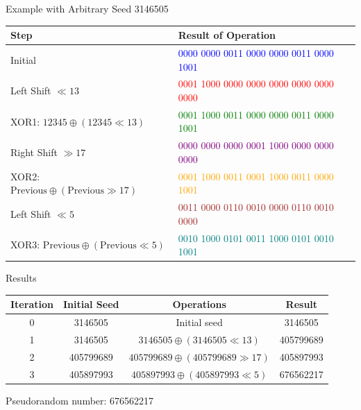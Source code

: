 \documentclass[aspectratio=169]{beamer}
\begin{document}
\begin{frame}{Example with Arbitrary Seed 3146505}
\begin{table}[h]

\begin{tabular}{|l|l|}
\hline
\textbf{Step} & \textbf{Result of Operation} \\
\hline
Initial & 
\textcolor{blue}{0000 0000 0011 0000 0000 0011 0000 1001} \\
\hline
Left Shift $\ll 13$ & 
\textcolor{red}{0001 1000 0000 0000 0000 0000 0000 0000} \\
\hline
XOR1: $12345 \oplus (12345 \ll 13)$ & 
\textcolor{green}{0001 1000 0011 0000 0000 0011 0000 1001} \\
\hline
Right Shift $\gg 17$ & 
\textcolor{purple}{0000 0000 0000 0001 1000 0000 0000 0000} \\
\hline
XOR2: $\text{Previous} \oplus (\text{Previous} \gg 17)$ & 
\textcolor{orange}{0001 1000 0011 0001 1000 0011 0000 1001} \\
\hline
Left Shift $\ll 5$ & 
\textcolor{brown}{0011 0000 0110 0010 0000 0110 0010 0000} \\
\hline
XOR3: $\text{Previous} \oplus (\text{Previous} \ll 5)$ & 
\textcolor{teal}{0010 1000 0101 0011 1000 0101 0010 1001} \\
\hline

\end{tabular}
\end{table}
\end{frame}

\begin{frame}{Results}
  
\begin{table}[h]

\begin{tabular}{|c|c|c|c|}
\hline
Iteration & Initial Seed & Operations & Result \\
\hline
0 & 3146505 & Initial seed & 3146505 \\
1 & 3146505 & $3146505 \oplus (3146505 \ll 13)$ & 405799689 \\
2 & 405799689 & $405799689 \oplus (405799689 \gg 17)$ & 405897993 \\
3 & 405897993 & $405897993 \oplus (405897993 \ll 5)$ & 676562217 \\
\hline
\end{tabular}
\end{table}


Pseudorandom number: 676562217
\end{frame}
\end{document}
